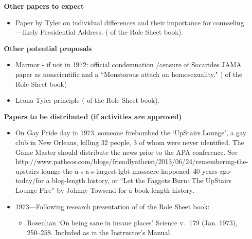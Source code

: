 \begin{refsection}
\textbf{Other papers to expect}

\begin{itemize}
\item Paper by Tyler on individual differences and their importance for counseling---likely Presidential Address. ( of the Role Sheet book).

\end{itemize}

\textbf{Other potential proposals}

\begin{itemize}
\item Marmor - if not in 1972: official condemnation \slash  censure of Socarides JAMA paper as nonscientific and a “Monstorous attach on homosexuality." ( of the Role Sheet book)

\item Leona Tyler principle ( of the Role Sheet book).

\end{itemize}

\textbf{Papers to be distributed (if activities are approved)}

\begin{itemize}
\item On Gay Pride day in 1973, someone firebombed the `UpStairs Lounge', a gay club in New Orleans, killing 32 people, 3 of whom were never identified. The Game Master should distribute the news prior to the APA conference. See http:\slash \slash www.patheos.com\slash blogs\slash friendlyatheist\slash 2013\slash 06\slash 24\slash remembering-the-upstairs-lounge-the-u-s-a-s-largest-lgbt-massacre-happened--40-years-ago-today\slash  for a blog-length history, or “Let the Faggots Burn: The UpStairs Lounge Fire” by Johnny Towsend for a book-length history.

\item 1973---Following research presentation of  of the Role Sheet book:

\begin{itemize}
\item Rosenhan `On being sane in insane places' Science v.. 179 (Jan. 1973), 250--258. Included as  in the Instructor's Manual.

\end{itemize}

\end{itemize}


\end{refsection}
